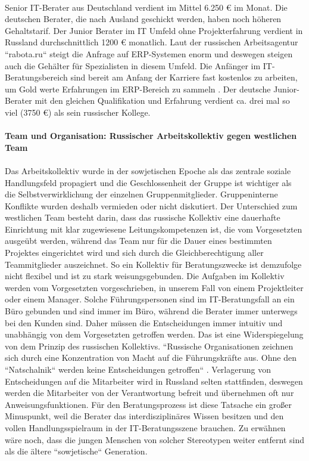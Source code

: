 \\
	Senior IT-Berater aus Deutschland verdient im Mittel 6.250 € im Monat\cite{GehaltSAPBerDE}. Die deutschen Berater, die nach Ausland geschickt werden, haben noch höheren Gehaltstarif. Der Junior Berater im IT Umfeld ohne Projekterfahrung  verdient in Russland durchschnittlich 1200 € monatlich\cite{GehaltSAPBerRU}. Laut der russischen Arbeitsagentur ``rabota.ru`` steigt die Anfrage auf ERP-Systemen enorm und deswegen steigen auch die Gehälter für Spezialisten in diesem Umfeld. Die Anfänger im IT-Beratungsbereich sind bereit am Anfang der Karriere fast kostenlos zu arbeiten, um Gold werte  Erfahrungen im ERP-Bereich zu sammeln \cite{RusGehRabota}.
	Der deutsche Junior-Berater mit den gleichen Qualifikation und Erfahrung verdient ca. drei mal so viel (3750 €) \cite{GehaltSAPBerDE} als sein russischer Kollege.\\
	\\
	 \newpage
	\textbf{Team und Organisation: Russischer Arbeitskollektiv gegen westlichen Team}\\
	\\
	Das Arbeitskollektiv wurde in der sowjetischen 
	Epoche als das zentrale soziale Handlungsfeld propagiert und die Geschlossenheit der Gruppe ist wichtiger als die Selbstverwirklichung der einzelnen Gruppenmitglieder\cite{ProzessbeglBerRU}.
	Gruppeninterne Konflikte wurden deshalb vermieden oder nicht diskutiert. Der Unterschied zum westlichen Team besteht darin, dass das russische Kollektiv eine dauerhafte Einrichtung mit klar zugewiesene Leitungskompetenzen ist, die vom Vorgesetzten ausgeübt werden, während das Team nur für die Dauer eines bestimmten Projektes eingerichtet wird und sich durch die Gleichberechtigung aller Teammitglieder auszeichnet.
	So ein Kollektiv für Beratungszwecke ist demzufolge nicht flexibel und ist zu stark weisungsgebunden. Die Aufgaben im Kollektiv werden vom Vorgesetzten vorgeschrieben, in unserem Fall von einem Projektleiter oder einem Manager. Solche Führungspersonen sind im IT-Beratungsfall an ein Büro gebunden und sind immer im Büro, während die Berater immer unterwegs bei den Kunden sind. Daher müssen die Entscheidungen immer intuitiv und unabhängig von dem Vorgesetzten getroffen werden. Das ist eine Widerspiegelung von dem Prinzip des russischen Kollektivs. ``Russische Organisationen zeichnen sich durch eine Konzentration von Macht auf die Führungskräfte aus. Ohne den ``Natschalnik`` werden keine Entscheidungen getroffen`` \cite{ProzessbeglBerRU}.
	Verlagerung von Entscheidungen auf die Mitarbeiter wird in Russland selten stattfinden, deswegen werden die Mitarbeiter von der Verantwortung befreit und übernehmen oft nur Anweisungsfunktionen. Für den Beratungsprozess ist diese Tatsache ein großer Minuspunkt, weil die Berater das interdisziplinäres Wissen besitzen und  den vollen Handlungsspielraum in der IT-Beratungsszene brauchen.
	Zu erwähnen wäre noch, dass die jungen Menschen von solcher Stereotypen weiter entfernt sind als die ältere ``sowjetische`` Generation. \\


